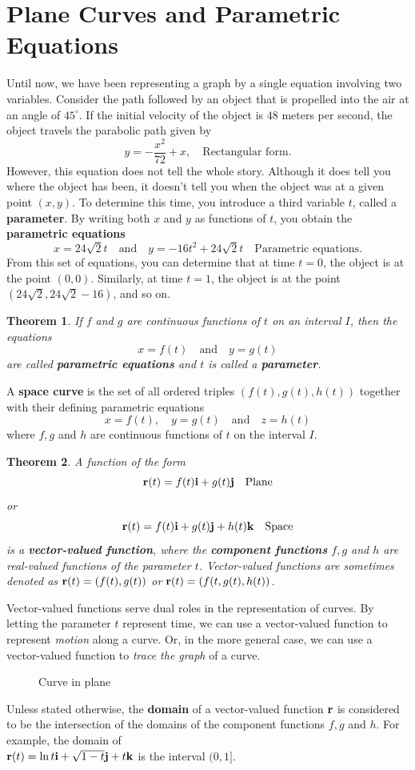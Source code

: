 \documentclass[titlepage,a4paper,12pt]{report}
\newtheorem{theorem}{Theorem}[section]
\begin{document}
\section{Plane Curves and Parametric Equations}
Until now, we have been representing a graph by a single equation involving two variables. Consider the path followed by an object that is propelled into the air at an angle of $45^\circ$. If the initial velocity of the object is $48$ meters per second, the object travels the parabolic path given by 
\[y=-\dfrac{x^2}{72}+x, \quad \mbox{Rectangular form}.\]
However, this equation does not tell the whole story. Although it does tell you where the object has been, it doesn't tell you when the object was at a given point $(x,y)$. To determine this time, you introduce a third variable $t$, called a \textbf{parameter}. By writing both $x$ and $y$ as functions of $t$, you obtain the \textbf{parametric equations}
\[x=24\sqrt{2}t \quad {\mbox{and}} \quad y=-16t^2+24\sqrt{2}t \quad {\mbox{Parametric equations}}. \]
From this set of equations, you can determine that at time $t=0$, the object is at the point $(0,0)$. Similarly, at time $t=1$, the object is at the point $(24\sqrt{2}, 24\sqrt{2}-16)$, and so on.
\begin{theorem}
If $f$ and $g$ are continuous functions of $t$ on an interval $I$, then the equations 
\[x=f(t) \quad \mbox{and} \quad y=g(t)\] are called \textbf{parametric equations} and $t$ is called a \textbf{parameter}. 
\end{theorem}
\noindent A \textbf{space curve} is the set of all ordered triples $(f(t), g(t), h(t))$ together with their defining parametric equations
\[x=f(t), \quad y=g(t) \quad \mbox{and} \quad z=h(t)\] where $f,g$ and $h$ are continuous functions of $t$ on the interval $I$.
\begin{theorem}
A function of the form 
\[{\bf{r}}(t) = f(t){\bf{i}}+g(t){\bf{j}} \quad \mbox{Plane}\] or \[{\bf{r}}(t)=f(t){\bf{i}}+g(t){\bf{j}}+h(t){\bf{k}} \quad \mbox{Space} \] is a \textbf{vector-valued function}, where the \textbf{component functions} $f,g$ and $h$ are real-valued functions of the parameter $t$. Vector-valued functions are sometimes denoted as ${\bf{r}}(t)=(f(t), g(t))$ or ${\bf{r}}(t)=(f(t, g(t), h(t))$.
\end{theorem}
\noindent Vector-valued functions serve dual roles in the representation of curves. By letting the parameter $t$ represent time, we can use a vector-valued function to represent \textit{motion} along a curve. Or, in the more general case, we can use a vector-valued function to \textit{trace the graph} of a curve. 
\begin{figure}

\caption{Curve in plane}
\end{figure}
\noindent Unless stated otherwise, the \textbf{domain} of a vector-valued function ${\bf{r}}$ is considered to be the intersection of the domains of the component functions $f,g$ and $h$. For example, the domain of \\${\bf{r}}(t)=\ln t {\bf{i}}+\sqrt{1-t}{\bf{j}}+t{\bf{k}}$ is the interval $(0,1]$.
\end{document}
